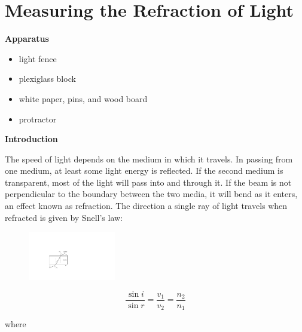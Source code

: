 
\section{Measuring the Refraction of Light}

\makelabheader %



\bigskip
\textbf{Apparatus} 

\begin{itemize}[nosep]
\item light fence 
\item plexiglass block 
\item white paper, pins, and wood board 
\item protractor
\end{itemize}

\textbf{Introduction}

The speed of light depends on the medium in which it travels. In passing
from one medium, at least some light energy is reflected. If the second
medium is transparent, most of the light will pass into and through
it. If the beam is not perpendicular to the boundary between the two
media, it will bend as it enters, an effect known as refraction. The
direction a single ray of light travels when refracted is given by
Snell's law:
\begin{figure}
\begin{raggedleft}
\vspace{0.1in}
\includegraphics[width=0.34\textwidth]{refraction_of_light/plexiglass_figure.pdf}

\end{raggedleft}
\end{figure}
\begin{displaymath} \frac{\sin i}{\sin r} = \frac{v_1}{v_2} = \frac{n_2}{n_1} \end{displaymath}

where

